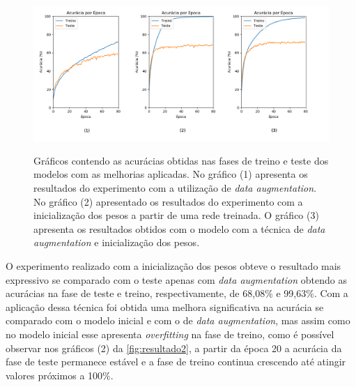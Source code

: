 \begin{figure}[H]
  \centering
  \caption{Gráficos contendo as acurácias obtidas nas fases de treino e teste dos modelos com as melhorias aplicadas. No gráfico (1) apresenta os resultados do experimento com a utilização de \textit{data augmentation}. No gráfico (2) apresentado os resultados do experimento com a inicialização dos pesos a partir de uma rede treinada. O gráfico (3) apresenta os resultados obtidos com o modelo com a técnica de \textit{data augmentation} e inicialização dos pesos.}
  \includegraphics[width=500pt]{dados/figuras/resultado2}
  \label{fig:resultado2}
\end{figure}

\par O experimento realizado com a inicialização dos pesos obteve o resultado mais expressivo se comparado com o teste apenas com \textit{data augmentation} obtendo as acurácias na fase de teste e treino, respectivamente, de 68,08\% e 99,63\%. Com a aplicação dessa técnica foi obtida uma melhora significativa na acurácia se comparado com o modelo inicial e com o de \textit{data augmentation}, mas assim como no modelo inicial esse apresenta \textit{overfitting} na fase de treino, como é possível observar nos gráficos (2) da \autoref{fig:resultado2}, a partir da época 20 a acurácia da fase de teste permanece estável e a fase de treino continua crescendo até atingir valores próximos a 100\%.

